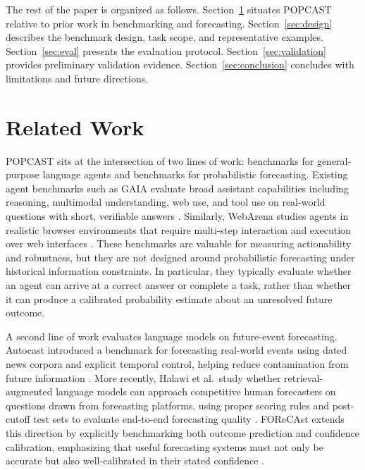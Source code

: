 \documentclass{article} %
\newcommand{\benchmarkname}{POPCAST}
\begin{document}
The rest of the paper is organized as follows. Section~\ref{sec:related} situates \benchmarkname{} relative to prior work in benchmarking and forecasting. Section~\ref{sec:design} describes the benchmark design, task scope, and representative examples. Section~\ref{sec:eval} presents the evaluation protocol. Section~\ref{sec:validation} provides preliminary validation evidence. Section~\ref{sec:conclusion} concludes with limitations and future directions.

\section{Related Work}
\label{sec:related}

\benchmarkname{} sits at the intersection of two lines of work: benchmarks for general-purpose language agents and benchmarks for probabilistic forecasting. Existing agent benchmarks such as GAIA evaluate broad assistant capabilities including reasoning, multimodal understanding, web use, and tool use on real-world questions with short, verifiable answers \citep{mialon2023gaia}. Similarly, WebArena studies agents in realistic browser environments that require multi-step interaction and execution over web interfaces \citep{zhou2024webarena}. These benchmarks are valuable for measuring actionability and robustness, but they are not designed around probabilistic forecasting under historical information constraints. In particular, they typically evaluate whether an agent can arrive at a correct answer or complete a task, rather than whether it can produce a calibrated probability estimate about an unresolved future outcome.

A second line of work evaluates language models on future-event forecasting. Autocast introduced a benchmark for forecasting real-world events using dated news corpora and explicit temporal control, helping reduce contamination from future information \citep{zou2022forecasting}. More recently, Halawi et al.\ study whether retrieval-augmented language models can approach competitive human forecasters on questions drawn from forecasting platforms, using proper scoring rules and post-cutoff test sets to evaluate end-to-end forecasting quality \citep{halawi2024approaching}. FOReCAst extends this direction by explicitly benchmarking both outcome prediction and confidence calibration, emphasizing that useful forecasting systems must not only be accurate but also well-calibrated in their stated confidence \citep{yuan2025forecast}.
\end{document}
